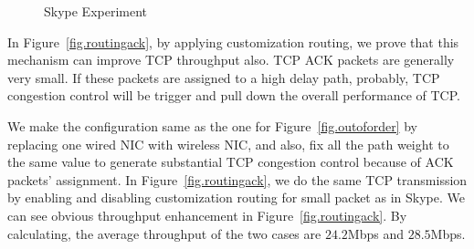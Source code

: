\begin{figure}[htb]
\caption{Skype Experiment}
\label{fig.skype}
\end{figure}


In Figure~\ref{fig.routingack}, by applying customization routing, we prove that this mechanism can improve TCP throughput also. TCP ACK packets are generally very small. If these packets are assigned to a high delay path, probably, TCP congestion control will be trigger and pull down the overall performance of TCP. 

We make the configuration same as the one for Figure~\ref{fig.outoforder} by replacing one wired NIC with wireless NIC, and also, fix all the path weight to the same value to generate substantial TCP congestion control because of ACK packets' assignment. In Figure~\ref{fig.routingack}, we do the same TCP transmission by enabling and disabling customization routing for small packet as in Skype. We can see obvious throughput enhancement in Figure~\ref{fig.routingack}. By calculating, the average throughput of the two cases are $24.2$Mbps and $28.5$Mbps.

